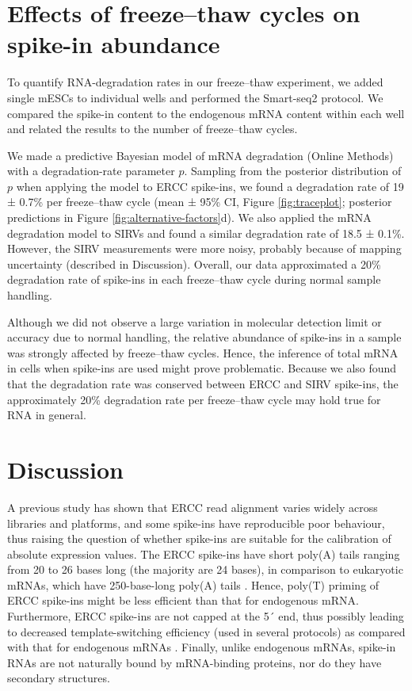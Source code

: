 \section{Effects of freeze–thaw cycles on spike-in abundance}

To quantify RNA-degradation rates in our freeze–thaw experiment, we added single mESCs to individual wells and performed the Smart-seq2 protocol. We compared the spike-in content to the endogenous mRNA content within each well and related the results to the number of freeze–thaw cycles.

We made a predictive Bayesian model of mRNA degradation (Online Methods) with a degradation-rate parameter \( p \). Sampling from the posterior distribution of \( p \) when applying the model to ERCC spike-ins, we found a degradation rate of 19 ± 0.7\% per freeze–thaw cycle (mean ± 95\% CI, Figure \ref{fig:traceplot}; posterior predictions in Figure \ref{fig:alternative-factors}d). We also applied the mRNA degradation model to SIRVs and found a similar degradation rate of 18.5 ± 0.1\%. However, the SIRV measurements were more noisy, probably because of mapping uncertainty (described in Discussion). Overall, our data approximated a 20\% degradation rate of spike-ins in each freeze–thaw cycle during normal sample handling.

Although we did not observe a large variation in molecular detection limit or accuracy due to normal handling, the relative abundance of spike-ins in a sample was strongly affected by freeze–thaw cycles. Hence, the inference of total mRNA in cells when spike-ins are used might prove problematic. Because we also found that the degradation rate was conserved between ERCC and SIRV spike-ins, the approximately 20\% degradation rate per freeze–thaw cycle may hold true for RNA in general.

\section{Discussion}

A previous study has shown \cite{SEQCMAQC-III_Consortium2014-uk} that ERCC read alignment varies widely across libraries and platforms, and some spike-ins have reproducible poor behaviour, thus raising the question of whether spike-ins are suitable for the calibration of absolute expression values. The ERCC spike-ins have short poly(A) tails ranging from 20 to 26 bases long (the majority are 24 bases), in comparison to eukaryotic mRNAs, which have 250-base-long poly(A) tails \cite{Viphakone2008-kh}. Hence, poly(T) priming of ERCC spike-ins might be less efficient than that for endogenous mRNA. Furthermore, ERCC spike-ins are not capped at the 5´ end, thus possibly leading to decreased template-switching efficiency (used in several protocols) as compared with that for endogenous mRNAs \cite{Kapteyn2010-rm}. Finally, unlike endogenous mRNAs, spike-in RNAs are not naturally bound by mRNA-binding proteins, nor do they have secondary structures.

